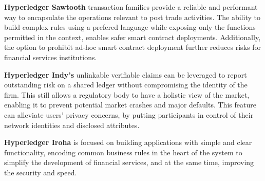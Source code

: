 \textbf{Hyperledger Sawtooth} transaction families provide a reliable and performant way to encapsulate the operations relevant to post trade activities. The ability to build complex rules using a prefered language while exposing only the functions permitted in the context, enables safer smart contract deployments. Additionally, the option to prohibit ad-hoc smart contract deployment further reduces risks for financial services institutions.

\textbf{Hyperledger Indy's} unlinkable verifiable claims can be leveraged to report outstanding risk on a shared ledger without compromising the identity of the firm. This still allows a regulatory body to have a holistic view of the market, enabling it to prevent potential market crashes and major defaults. This feature can alleviate users' privacy concerns, by putting participants in control of their network identities and disclosed attributes.

\textbf{Hyperledger Iroha} is focused on building applications with simple and clear functionality, encoding common business rules in the heart of the system to simplify the development of financial services, and at the same time, improving the security and speed.